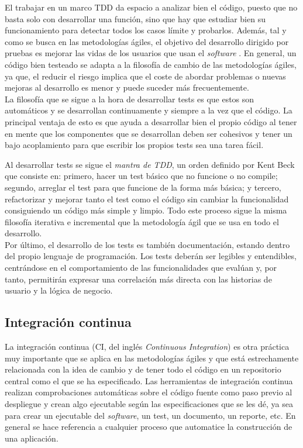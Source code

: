 El trabajar en un marco TDD da espacio a analizar bien el código, puesto que no
basta solo con desarrollar una función, sino que hay que estudiar bien su
funcionamiento para detectar todos los casos límite y probarlos. Además, tal y
como se busca en las metodologías ágiles, el objetivo del desarrollo dirigido
por pruebas es mejorar las vidas de los usuarios que usan el \textit{software}
\cite{beck2002driven}. En general, un código bien testeado se adapta a la
filosofía de cambio de las metodologías ágiles, ya que, el reducir el riesgo
implica que el coste de abordar problemas o nuevas mejoras al desarrollo es
menor y puede suceder más frecuentemente.\\

La filosofía que se sigue a la hora de desarrollar tests es que estos son
automáticos y se desarrollan continuamente y siempre a la vez que el código. La
principal ventaja de esto es que ayuda a desarrollar bien el propio código al
tener en mente que los componentes que se desarrollan deben ser cohesivos y
tener un bajo acoplamiento para que escribir los propios tests sea una tarea
fácil.

Al desarrollar tests se sigue el \textit{mantra de TDD}, un orden definido por
Kent Beck \cite{beck2002driven} que consiste en: primero, hacer un test básico
que no funcione o no compile; segundo, arreglar el test para que funcione de la
forma más básica; y tercero, refactorizar y mejorar tanto el test como el código
sin cambiar la funcionalidad consiguiendo un código más simple y limpio. Todo
este proceso sigue la misma filosofía iterativa e incremental que la metodología
ágil que se usa en todo el desarrollo.\\

Por último, el desarrollo de los tests es también documentación, estando dentro
del propio lenguaje de programación. Los tests deberán ser legibles y
entendibles, centrándose en el comportamiento de las funcionalidades que evalúan
y, por tanto, permitirán expresar una correlación más directa con las historias
de usuario y la lógica de negocio.

\subsection{Integración continua}
La integración continua (CI, del inglés \textit{Continuous Integration}) es otra
práctica muy importante que se aplica en las metodologías ágiles y que está
estrechamente relacionada con la idea de cambio y de tener todo el código en un
repositorio central como el que se ha especificado. Las herramientas de
integración continua realizan comprobaciones automáticas sobre el código fuente
como paso previo al despliegue y crean algo ejecutable según las
especificaciones que se les dé, ya sea para crear un ejecutable del
\textit{software}, un test, un documento, un reporte, etc. En general se hace
referencia a cualquier proceso que automatice la construcción de una
aplicación.\\

